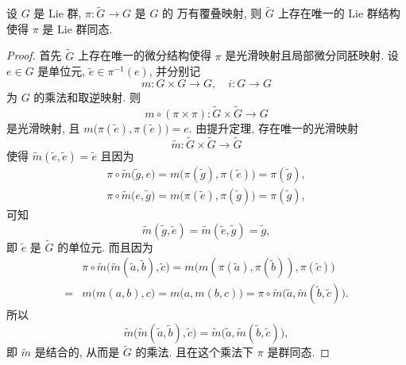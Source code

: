     \begin{proposition}
        设 $G$ 是 $\mathrm{Lie}$ 群, $\pi:\tilde{G}\rightarrow G$ 是 $G$ 的
        万有覆叠映射, 则 $\tilde{G}$ 上存在唯一的 $\mathrm{Lie}$ 群结构使得 
        $\pi$ 是 $\mathrm{Lie}$ 群同态.
    \end{proposition}
    \begin{proof}
        首先 $\tilde{G}$ 上存在唯一的微分结构使得 
        $\pi$ 是光滑映射且局部微分同胚映射. 
        设 $e\in G$ 是单位元, $\tilde{e}\in\pi^{-1}(e)$, 
        并分别记 
        \begin{equation*}
           m:G\times G\rightarrow G,\quad i:G\rightarrow G 
        \end{equation*}
        为 $G$ 的乘法和取逆映射. 则 
        \begin{equation*}
            m\circ(\pi\times\pi):\tilde{G}\times\tilde{G}\rightarrow G
        \end{equation*}
        是光滑映射, 且 $m\big(\pi(\tilde{e}),\pi(\tilde{e})\big) = e$. 
        由提升定理, 存在唯一的光滑映射
        \begin{equation*}
            \tilde{m}:\tilde{G}\times\tilde{G}\rightarrow\tilde{G}
        \end{equation*}
        使得 $\tilde{m}(\tilde{e},\tilde{e}) = \tilde{e}$ 且因为
        \begin{gather*}
            \pi\circ\tilde{m}\big(\tilde{g},e\big) 
            = m\big(\pi(\tilde{g}),\pi(\tilde{e})\big) 
            = \pi(\tilde{g}), \\
            \pi\circ\tilde{m}\big(e,\tilde{g}\big) 
            = m\big(\pi(\tilde{e}),\pi(\tilde{g})\big) 
            = \pi(\tilde{g}),
        \end{gather*}
        可知 
        \begin{equation*}
            \tilde{m}(\tilde{g},\tilde{e}) 
            = \tilde{m}(\tilde{e},\tilde{g}) 
            = \tilde{g},
        \end{equation*}
        即 $\tilde{e}$ 是 $\tilde{G}$ 的单位元. 
        而且因为
        \begin{align*}
        &\pi\circ\tilde{m}\big(\tilde{m}(\tilde{a},\tilde{b}),\tilde{c}\big) 
        = m\big(m(\pi(\tilde{a}),\pi(\tilde{b})),\pi(\tilde{c})\big) \\
        =& m\big(m(a,b),c\big) = m\big(a,m(b,c)\big) 
        = \pi\circ\tilde{m}\big(\tilde{a},\tilde{m}(\tilde{b},\tilde{c})\big).
        \end{align*}
        所以
        \begin{equation*}
            \tilde{m}\big(\tilde{m}(\tilde{a},\tilde{b}),\tilde{c}\big) 
            = \tilde{m}\big(\tilde{a},\tilde{m}(\tilde{b},\tilde{c})\big),
        \end{equation*}
        即 $\tilde{m}$ 是结合的, 从而是 $\tilde{G}$ 的乘法. 
        且在这个乘法下 $\pi$ 是群同态. 
        

\end{proof}
